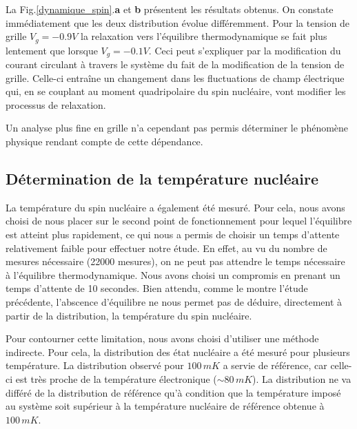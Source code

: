 La Fig.\ref{dynamique_spin}.\textbf{a} et \textbf{b} présentent les résultats obtenus. On constate immédiatement que les deux distribution évolue différemment. Pour la tension de grille $V_g = -0.9V$ la relaxation vers l'équilibre thermodynamique se fait plus lentement que lorsque $V_g = -0.1V$.  Ceci peut s'expliquer par la modification du courant circulant à travers le système du fait de la modification de la tension de grille. Celle-ci entraîne un changement dans les fluctuations de champ électrique  qui, en se couplant au moment quadripolaire du spin nucléaire, vont modifier les processus de relaxation.

Un analyse plus fine en grille n'a cependant pas permis déterminer le phénomène physique rendant compte de cette dépendance.

\subsection{Détermination de la température nucléaire}
La température du spin nucléaire a également été mesuré. Pour cela, nous avons choisi de nous placer sur le second point de fonctionnement pour lequel l'équilibre est atteint plus rapidement, ce qui nous  a permis de choisir un temps d'attente relativement faible pour effectuer notre étude. En effet, au vu du nombre de mesures nécessaire (22000 mesures), on ne peut pas attendre le temps nécessaire à l'équilibre thermodynamique. Nous avons choisi un compromis en prenant un temps d'attente de 10 secondes. Bien attendu, comme le montre l'étude précédente, l'abscence d'équilibre ne nous permet pas de déduire, directement à partir de la distribution, la température du spin nucléaire.

Pour contourner cette limitation, nous avons choisi d'utiliser une méthode indirecte. Pour cela, la distribution des état nucléaire a été mesuré pour plusieurs température. La distribution observé pour $100\,mK$ a servie de référence, car celle-ci est très proche de la température électronique ($\sim 80\,mK$). La distribution ne va différé de la distribution de référence qu'à condition que la température imposé au système soit supérieur à la température nucléaire de référence obtenue à $100\,mK$.

